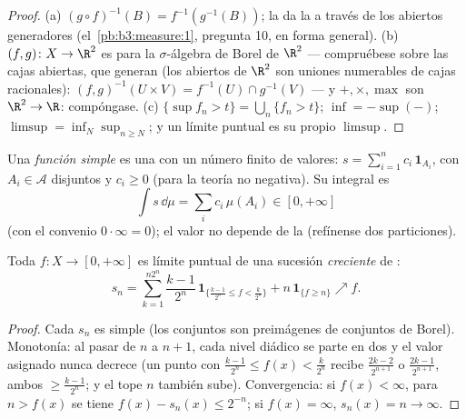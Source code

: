 \begin{proof}
(a) $(g\circ f)^{-1}(B) = f^{-1}(g^{-1}(B))$; la
 da la
 a través de los
abiertos generadores
(el~\cref{pb:b3:measure:1}, pregunta 10, en forma general). (b)
$(f, g) \colon X \to \R^2$ es
 para la $\sigma$-álgebra de
Borel de $\R^2$ --- compruébese sobre las cajas abiertas, que generan
(los abiertos de $\R^2$ son uniones numerables de cajas racionales):
$(f,g)^{-1}(U\times V) = f^{-1}(U)\cap g^{-1}(V)$ --- y
$+, \times, \max$ son 
$\R^2 \to \R$: compóngase.
(c) $\{\sup f_n > t\} = \bigcup_n\{f_n > t\}$; $\inf = -\sup(-)$;
$\limsup = \inf_N\sup_{n \geq N}$; y un límite puntual es su propio
$\limsup$.
\end{proof}

\begin{definition}\label{def:b3:lebesgue:simple}
Una \emph{función simple} es una
 con un número
finito de valores: $s = \sum_{i=1}^n
c_i\,\mathbf 1_{A_i}$, con $A_i \in \mathcal A$ disjuntos y $c_i \geq
0$ (para la teoría no negativa). Su integral es
\[
\int s\,\dd\mu = \sum_i c_i\,\mu(A_i) \in [0, +\infty]
\]
(con el convenio $0\cdot\infty = 0$); el valor no depende de la
 (refínense dos
particiones).
\end{definition}

\begin{theorem}
\label{thm:b3:lebesgue:approximation}
Toda 
$f \colon X \to [0, +\infty]$ es límite puntual de una sucesión
\emph{creciente} de :
\[
s_n = \sum_{k=1}^{n2^n} \frac{k-1}{2^n}\,
\mathbf 1_{\{\frac{k-1}{2^n} \leq f < \frac k{2^n}\}}
+ n\,\mathbf 1_{\{f \geq n\}} \nearrow f .
\]
\end{theorem}

\begin{proof}
Cada $s_n$ es simple (los conjuntos son preimágenes de conjuntos de
Borel). Monotonía: al pasar de $n$ a $n+1$, cada nivel diádico se parte
en dos y el valor asignado nunca decrece (un punto con
$\frac{k-1}{2^n} \leq f(x) < \frac k{2^n}$ recibe $\frac{2k-2}{2^{n+1}}$
o $\frac{2k-1}{2^{n+1}}$, ambos $\geq
\frac{k-1}{2^n}$; y el tope $n$ también sube). Convergencia: si
$f(x) < \infty$, para $n > f(x)$ se tiene $f(x) - s_n(x) \leq
2^{-n}$; si $f(x) = \infty$, $s_n(x) = n \to \infty$.
\end{proof}

